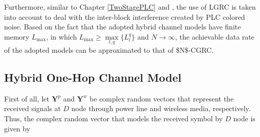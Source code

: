 Furthermore, similar to Chapter \ref{TwoStagePLC} and \cite{Victor2017,Victor2018,Leo2017}, the use of \ac{LGRC} \cite{Goldsmith2001,Choudhuri2014} is taken into account to deal with the inter-block interference created by \ac{PLC} colored noise. Based on the fact that the adopted hybrid channel models have finite memory $ L_{\text{max}} $, in which $ L_{\text{max}} \geq \max\limits_{l,q} \{L_{l}^q\}$ and $ N \rightarrow \infty $, the achievable data rate of the adopted models can be approximated to that of \ac{$N$-CGRC}. 

\subsection{\textbf{Hybrid One-Hop Channel Model}}\label{subsec:hohc}

First of all, let $ \mathbf{Y}^{p} $ and $ \mathbf{Y}^{w} $ be complex random vectors that represent the received signals at $D$ node through power line and wireless media, respectively. Thus, the complex random vector that models the received symbol by $D$ node is given by

